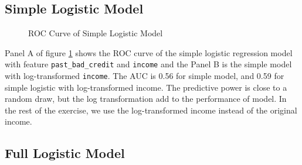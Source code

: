 \documentclass[10pt]{article} %
\begin{document}
    \subsection{Simple Logistic Model}
    \begin{figure}
        \centering
        \hfill
        \caption{ROC Curve of Simple Logistic Model}
        \label{fig:roc_simlogistic}
    \end{figure}

    Panel A of figure \ref{fig:roc_simlogistic} shows the ROC curve of the simple logistic regression model with feature \texttt{past\_bad\_credit} and \texttt{income} and the Panel B is the simple model with log-transformed \texttt{income}. The AUC is 0.56 for simple model, and 0.59 for simple logistic with log-transformed income. The predictive power is close to a random draw, but the log transformation add to the performance of model. In the rest of the exercise, we use the log-transformed income instead of the original income.

    \subsection{Full Logistic Model}
\end{document}
